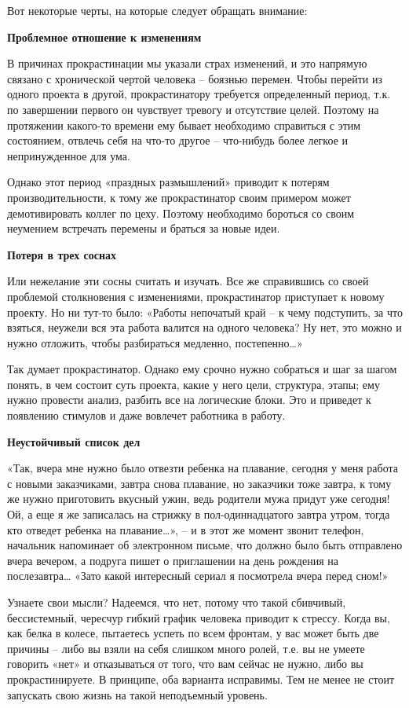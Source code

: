 Вот некоторые черты, на которые следует обращать внимание:

\textbf{Проблемное отношение к изменениям}

В причинах прокрастинации мы указали страх изменений, и это напрямую связано с хронической чертой человека – боязнью перемен. Чтобы перейти из одного проекта в другой, прокрастинатору требуется определенный период, т.к. по завершении первого он чувствует тревогу и отсутствие целей. Поэтому на протяжении какого-то времени ему бывает необходимо справиться с этим состоянием, отвлечь себя на что-то другое – что-нибудь более легкое и непринужденное для ума.

Однако этот период «праздных размышлений» приводит к потерям производительности, к тому же прокрастинатор своим примером может демотивировать коллег по цеху. Поэтому необходимо бороться со своим неумением встречать перемены и браться за новые идеи.

\textbf{Потеря в трех соснах}


Или нежелание эти сосны считать и изучать. Все же справившись со своей проблемой столкновения с изменениями, прокрастинатор приступает к новому проекту. Но ни тут-то было: «Работы непочатый край – к чему подступить, за что взяться, неужели вся эта работа валится на одного человека? Ну нет, это можно и нужно отложить, чтобы разбираться медленно, постепенно…»

Так думает прокрастинатор. Однако ему срочно нужно собраться и шаг за шагом понять, в чем состоит суть проекта, какие у него цели, структура, этапы; ему нужно провести анализ, разбить все на логические блоки. Это и приведет к появлению стимулов и даже вовлечет работника в работу.

\textbf{Неустойчивый список дел}

«Так, вчера мне нужно было отвезти ребенка на плавание, сегодня у меня работа с новыми заказчиками, завтра снова плавание, но заказчики тоже завтра, к тому же нужно приготовить вкусный ужин, ведь родители мужа придут уже сегодня! Ой, а еще я же записалась на стрижку в пол-одиннадцатого завтра утром, тогда кто отведет ребенка на плавание…», – и в этот же момент звонит телефон, начальник напоминает об электронном письме, что должно было быть отправлено вчера вечером, а подруга пишет о приглашении на день рождения на послезавтра… «Зато какой интересный сериал я посмотрела вчера перед сном!»

Узнаете свои мысли? Надеемся, что нет, потому что такой сбивчивый, бессистемный, чересчур гибкий график человека приводит к стрессу. Когда вы, как белка в колесе, пытаетесь успеть по всем фронтам, у вас может быть две причины – либо вы взяли на себя слишком много ролей, т.е. вы не умеете говорить «нет» и отказываться от того, что вам сейчас не нужно, либо вы прокрастинируете. В принципе, оба варианта исправимы. Тем не менее не стоит запускать свою жизнь на такой неподъемный уровень.

